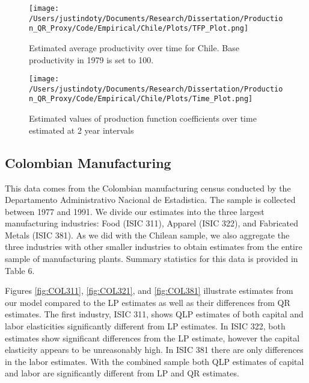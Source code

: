 \documentclass[11pt]{article}
\begin{document}
\begin{figure}[H]
\centering
\texttt{[image: /Users/justindoty/Documents/Research/Dissertation/Production\_QR\_Proxy/Code/Empirical/Chile/Plots/TFP\_Plot.png]}
\caption{Estimated average productivity over time for Chile. Base productivity in 1979 is set to 100.}
\label{fig:CHLpgrowth}
\end{figure}


\begin{figure}[H]
\centering
\texttt{[image: /Users/justindoty/Documents/Research/Dissertation/Production\_QR\_Proxy/Code/Empirical/Chile/Plots/Time\_Plot.png]}
\caption{Estimated values of production function coefficients over time estimated at 2 year intervals}
\label{fig:CHLtimecoef}
\end{figure}



\subsection{Colombian Manufacturing}
This data comes from the Colombian manufacturing census conducted by the Departamento Administrativo Nacional de Estadistica. The sample is collected between 1977 and 1991. We divide our estimates into the three largest manufacturing industries: Food (ISIC 311), Apparel (ISIC 322), and Fabricated Metals (ISIC 381). As we did with the Chilean sample, we also aggregate the three industries with other smaller industries to obtain estimates from the entire sample of manufacturing plants. Summary statistics for this data is provided in Table 6.



Figures \ref{fig:COL311}, \ref{fig:COL321}, and \ref{fig:COL381} illustrate estimates from our model compared to the LP estimates as well as their differences from QR estimates. The first industry, ISIC 311, shows QLP estimates of both capital and labor elasticities significantly different from LP estimates. In ISIC 322, both estimates show significant differences from the LP estimate, however the capital elasticity appears to be unreasonably high. In ISIC 381 there are only differences in the labor estimates. With the combined sample both QLP estimates of capital and labor are significantly different from LP and QR estimates.
\end{document}
